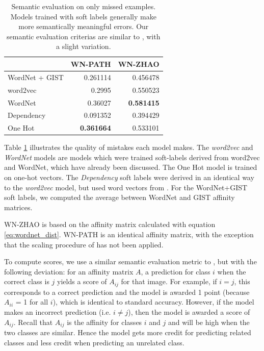 \begin{table}[!tb]
    \centering
    \begin{tabular}{lrr}
         & WN-PATH & WN-ZHAO\\
        \hline
        WordNet + GIST & 0.261114 & 0.456478\\
        word2vec & 0.2995 & 0.550523\\
        WordNet & 0.36027 & \textbf{0.581415}\\
        Dependency & 0.091352 & 0.394429\\
        One Hot & \textbf{0.361664} & 0.533101\\
    \end{tabular}
  \caption{
      Semantic evaluation on only missed examples. Models trained
      with soft labels generally make more semantically meaningful errors. Our
      semantic evaluation criterias are similar to \cite{zhao2011large}, with a
      slight variation.
  }
  \label{tbl:semantic_misses}
\end{table}

Table \ref{tbl:semantic_misses} illustrates the quality of mistakes each model
makes. The \emph{word2vec} and \emph{WordNet} models are models which were
trained soft-labels derived from word2vec and WordNet, which have already been
discussed. The One Hot model is trained on one-hot vectors. The
\emph{Dependency} soft labels were derived in an identical way to the
\emph{word2vec} model, but used word vectors from \cite{levy2014dependency}.
For the WordNet+GIST soft labels, we computed the average between WordNet and
GIST affinity matrices.

WN-ZHAO is based on the affinity matrix calculated with equation
\ref{eq:wordnet_dist}. WN-PATH is an identical affinity matrix, with the
exception that the scaling procedure of \cite{zhao2011large} has not been
applied.

To compute scores, we use a similar semantic evaluation metric to
\cite{zhao2011large}, but with the following deviation: for an affinity matrix
$A$, a prediction for class $i$ when the correct class is $j$ yields a score of
$A_{ij}$ for that image. For example, if $i = j$, this corresponds to a correct
prediction and the model is awarded 1 point (because $A_{ii}$ = 1 for all $i$),
which is identical to standard accuracy. However, if the model makes an
incorrect prediction (i.e. $i \neq j$), then the model is awarded a score of
$A_{ij}$.  Recall that $A_{ij}$ is the affinity for classes $i$ and $j$ and will
be high when the two classes are similar. Hence the model gets more credit for
predicting related classes and less credit when predicting an unrelated class.


